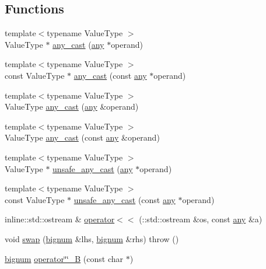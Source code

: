 \subsection*{\-Functions}
\begin{DoxyCompactItemize}
\item 
{\footnotesize template$<$typename Value\-Type $>$ }\\\-Value\-Type $\ast$ \hyperlink{namespaceyuh_a1487bbf77dc336991025682f279ee186}{any\-\_\-cast} (\hyperlink{classyuh_1_1any}{any} $\ast$operand)
\item 
{\footnotesize template$<$typename Value\-Type $>$ }\\const \-Value\-Type $\ast$ \hyperlink{namespaceyuh_afcf58d96b738d63f59f457cb7a408300}{any\-\_\-cast} (const \hyperlink{classyuh_1_1any}{any} $\ast$operand)
\item 
{\footnotesize template$<$typename Value\-Type $>$ }\\\-Value\-Type \hyperlink{namespaceyuh_a26fb722b89b4bd877ac0a45557197300}{any\-\_\-cast} (\hyperlink{classyuh_1_1any}{any} \&operand)
\item 
{\footnotesize template$<$typename Value\-Type $>$ }\\\-Value\-Type \hyperlink{namespaceyuh_a4022d9d928efe991fb8725cef52cde4a}{any\-\_\-cast} (const \hyperlink{classyuh_1_1any}{any} \&operand)
\item 
{\footnotesize template$<$typename Value\-Type $>$ }\\\-Value\-Type $\ast$ \hyperlink{namespaceyuh_ad72d3b8a727efe68d300bb6f91a3d85a}{unsafe\-\_\-any\-\_\-cast} (\hyperlink{classyuh_1_1any}{any} $\ast$operand)
\item 
{\footnotesize template$<$typename Value\-Type $>$ }\\const \-Value\-Type $\ast$ \hyperlink{namespaceyuh_a1e4530cf87293d06d58291053f365d01}{unsafe\-\_\-any\-\_\-cast} (const \hyperlink{classyuh_1_1any}{any} $\ast$operand)
\item 
inline\-::std\-::ostream \& \hyperlink{namespaceyuh_aa95ffb9b508c97ed18bd470d6b1f62f3}{operator$<$$<$} (\-::std\-::ostream \&os, const \hyperlink{classyuh_1_1any}{any} \&a)
\item 
void \hyperlink{namespaceyuh_aa193df2583649f98adcb61639763872d}{swap} (\hyperlink{classyuh_1_1bignum}{bignum} \&lhs, \hyperlink{classyuh_1_1bignum}{bignum} \&rhs)  throw ()
\item 
\hyperlink{classyuh_1_1bignum}{bignum} \hyperlink{namespaceyuh_aa5ca9c97a6e2f8461ef346724d9f4a3c}{operator\char`\"{}\char`\"{}\-\_\-\-B} (const char $\ast$)

\end{DoxyCompactItemize}
